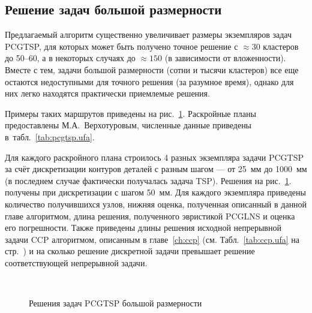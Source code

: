 
\subsection*{%
Решение задач большой размерности
}
\label{sec:pcgtsp.ufa}

Предлагаемый алгоритм существенно увеличивает размеры
экземпляров задач PCGTSP,
для которых может быть получено точное решение с
$\approx 30$ кластеров
\cite{bi:RoMa}
до 50--60,
а в некоторых случаях до
$\approx 150$
(в зависимости от вложенности).
Вместе с тем,
задачи большой размерности
(сотни и тысячи кластеров)
все еще остаются недоступными для точного
решения
(за разумное время),
однако для них легко находятся
практически приемлемые решения.

Примеры таких маршрутов приведены на
рис.~\ref{fig:pcgtsp.ufa}.
Раскройные планы предоставлены
М.А.~Верхотуровым,
численные данные приведены
в~табл.~\ref{tab:pcgtsp.ufa}.

Для каждого раскройного плана
строилось 4 разных экземпляра задачи
PCGTSP
за счёт дискретизации контуров деталей с разным
шагом ---
от 25~мм до 1000~мм
(в последнем случае фактически получалась
задача TSP).
Решения на рис.~\ref{fig:pcgtsp.ufa}.
получены при дискретизации с шагом
50~мм.
Для каждого экземпляра приведены
количество получившихся узлов,
нижняя оценка,
полученная описанный в данной главе алгоритмом,
длина решения, полученного эвристикой PCGLNS
и оценка его погрешности.
Также приведены длины решения
исходной непрерывной задачи CCP
алгоритмом,
описанным в главе~\ref{ch:ccp}
(см. Табл.~\ref{tab:ccp.ufa}
на стр.~\pageref{tab:ccp.ufa})
и на сколько решение дискретной задачи
превышает решение соответствующей
непрерывной задачи.

\begin{figure}
  \centering
  \\
  \caption{Решения задач PCGTSP большой размерности}
  \label{fig:pcgtsp.ufa}
\end{figure}

